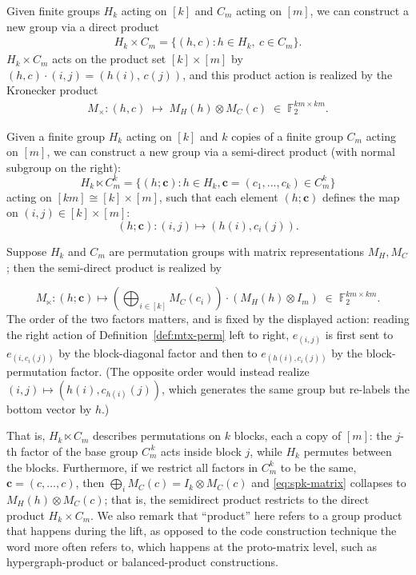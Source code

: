 \begin{definition}\label{def:direct-product}
Given finite groups $H_k$ acting on $[k]$ and $C_m$ acting on $[m]$, we can construct a new group via a direct product 
\begin{align*}
     H_k \times C_m = \{(h, c): h\in H_k,\ c\in C_m\}.
\end{align*}
$H_k \times C_m$ acts on the product set $[k]\times[m]$ by $(h,c)\cdot(i,j) = (h(i),\, c(j))$, and this product action is realized by the Kronecker product
\begin{align*}
     M_\times: (h,c) \;\mapsto\; M_H(h)\otimes M_C(c) \;\in\; \mathbb F_2^{km\times km}.
\end{align*}

\end{definition}

\begin{definition}\label{def:semidirect-product}
Given a finite group $H_k$ acting on $[k]$ and $k$ copies of a finite group $C_m$ acting on $[m]$, we can construct a new group via a semi-direct product (with normal subgroup on the right):
$$
H_k \ltimes C_m^{k} = \{(h;\mathbf c): h\in H_k, \mathbf c =(c_1,...,c_k)\in C_m^k \}
$$
acting on $[km] \cong [k]\times [m]$, such that each element $ (h; \mathbf{c})$ defines the map on $(i, j)\in [k]\times [m]$:
$$
  (h;\mathbf{c}):  (i, j ) \mapsto (h(i), c_{i}(j)).
$$

Suppose $H_k$ and $C_m$ are permutation groups with matrix representations $M_H, M_C$; then the semi-direct product is realized by

\begin{equation}\label{eq:spk-matrix}
  M_\ltimes : (h;\mathbf c)\mapsto
 \left(\bigoplus_{i\in[k]} M_C(c_i)\right)\cdot\left( M_H(h)\otimes I_m\right)
  \;\in\;\mathbb F_2^{km\times km}.
\end{equation}
The order of the two factors matters, and is fixed by the displayed action: reading the right action of Definition~\ref{def:mtx-perm} left to right, $e_{(i,j)}$ is first sent to $e_{(i,c_i(j))}$ by the block-diagonal factor and then to $e_{(h(i),c_i(j))}$ by the block-permutation factor. (The opposite order would instead realize $(i,j)\mapsto (h(i), c_{h(i)}(j))$, which generates the same group but re-labels the bottom vector by $h$.)
\end{definition}


That is, $H_k\ltimes  C_m $ describes permutations on $k$ blocks, each a copy of $[m]$: the $j$-th factor of the base group $C_m^{\,k}$ acts inside block $j$, while $H_k$ permutes between the blocks. Furthermore, if we restrict all factors in $C^k_m$ to be the same, $\mathbf c = (c,\dots,c)$, then $\bigoplus_i M_C(c) = I_k\otimes M_C(c)$ and \eqref{eq:spk-matrix} collapses to $M_H(h)\otimes M_C(c)$; that is, the semidirect product restricts to the direct product $H_k\times C_m$. We also remark that ``product'' here refers to a group product that happens during the lift, as opposed to the code construction technique the word more often refers to, which happens at the proto-matrix level, such as hypergraph-product or balanced-product constructions.

